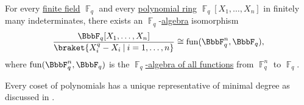 \begin{proposition}\label{thm:functions_over_finite_fields}
  For every \hyperref[def:finite_field]{finite field} \( \BbbF_q \) and every \hyperref[def:polynomial_algebra]{polynomial ring} \( \BbbF_q[X_1, \ldots, X_n] \) in finitely many indeterminates, there exists an \( \BbbF_q \)-\hyperref[def:algebra_over_ring]{algebra} isomorphism
  \begin{equation*}
    \frac {\BbbF_q[X_1, \ldots, X_n]} {\braket{ X_i^q - X_i \given i = 1, \ldots, n }} \cong \fun(\BbbF_q^n, \BbbF_q),
  \end{equation*}
  where \( \fun(\BbbF_q^n, \BbbF_q) \) is the \hyperref[thm:functions_over_algebra]{\( \BbbF_q \)-algebra of all functions} from \( \BbbF
  _q^n \) to \( \BbbF_q \).
\end{proposition}
\begin{comments}
  \item Every coset of polynomials has a unique representative of minimal degree as discussed in .
\end{comments}
